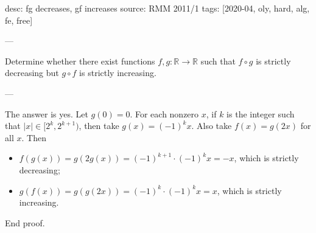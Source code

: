 desc: f\circ g decreases, g\circ f increases
source: RMM 2011/1
tags: [2020-04, oly, hard, alg, fe, free]

---

Determine whether there exist functions $f,g:\mathbb R\to\mathbb R$ such that $f\circ g$ is strictly decreasing but $g\circ f$ is strictly increasing.

---

The answer is yes. Let $g(0)=0$. For each nonzero $x$, if $k$ is the integer such that $|x|\in[2^k,2^{k+1})$, then take $g(x)=(-1)^kx$. Also take $f(x)=g(2x)$ for all $x$. Then
\begin{itemize}[itemsep=0em]
    \item $f(g(x))=g(2g(x))=(-1)^{k+1}\cdot(-1)^kx=-x$, which is strictly decreasing;
    \item $g(f(x))=g(g(2x))=(-1)^k\cdot(-1)^kx=x$, which is strictly increasing.
\end{itemize}
End proof.
